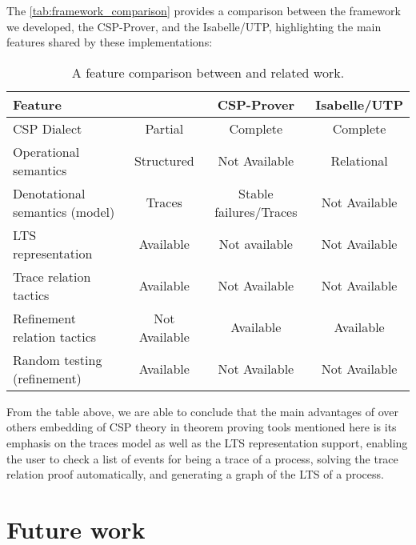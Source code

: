 The \autoref{tab:framework_comparison} provides a comparison between the framework we developed, the CSP-Prover, and the Isabelle/UTP, highlighting the main features shared by these implementations:

\begin{table}[htb]
	\begin{center}
		\caption[A feature comparison between \CSPcoq{} and related work]{A feature comparison between \CSPcoq{} and related work.}
		\label{tab:framework_comparison}
		\begin{tabular}{ |l|c|c|c| }
			\hline
			Feature & \CSPcoq{} & CSP-Prover & Isabelle/UTP \\
			\hline
			CSP Dialect & Partial & Complete & Complete \\ [0.5ex]
			Operational semantics & Structured & Not Available & Relational \\ [0.5ex]
			Denotational semantics (model) & Traces & Stable failures/Traces & Not Available \\ [0.5ex]
			LTS representation & Available & Not available & Not Available \\ [0.5ex]
			Trace relation tactics & Available & Not Available & Not Available \\ [0.5ex]
			Refinement relation tactics & Not Available & Available & Available \\ [0.5ex]
			Random testing (refinement) & Available & Not Available & Not Available \\ [0.5ex]
			\hline
		\end{tabular}
	\end{center}
\end{table}

From the table above, we are able to conclude that the main advantages of \CSPcoq{} over others embedding of CSP theory in theorem proving tools mentioned here is its emphasis on the traces model as well as the LTS representation support, enabling the user to check a list of events for being a trace of a process, solving the trace relation proof automatically, and generating a graph of the LTS of a process.

\section{Future work}


